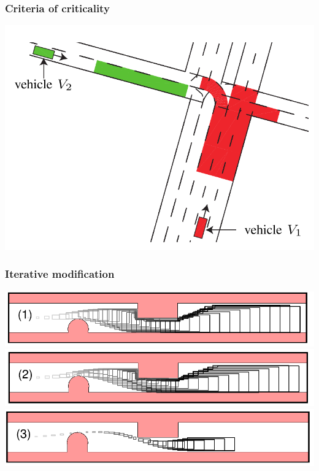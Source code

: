 \documentclass{beamer}
\begin{document}
\begin{frame}
    \frametitle{Criteria of criticality}
    \includegraphics[height=0.85\textheight]{drivableArea.png}
\end{frame}

\begin{frame}
    \frametitle{Iterative modification}
    \includegraphics[width=\textwidth]{drivableArea(1).png}
    \pause{}
    \includegraphics[width=\textwidth]{drivableArea(2).png}
    \pause{}
    \includegraphics[width=\textwidth]{drivableArea(3).png}
\end{frame}
\end{document}
